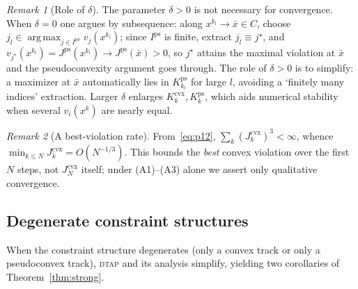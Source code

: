 \documentclass[]{interact}
\theoremstyle{plain}
\theoremstyle{definition}
\theoremstyle{remark}
\newtheorem{remark}{Remark}
\DeclareMathOperator*{\argmax}{arg\,max}
\newcommand{\cvx}{\mathrm{cvx}}
\newcommand{\ps}{\mathrm{ps}}
\newcommand{\dtap}{\textsc{dtap}}
\begin{document}
\begin{remark}[Role of $\delta$]\label{rem:delta-role}
The parameter $\delta>0$ is not necessary for convergence. When $\delta=0$ one argues by
subsequence: along $x^{k_l}\to\bar x\in C$, choose
$j_l\in\argmax_{j\in I^{\ps}}v_j(x^{k_l})$; since $I^{\ps}$ is finite, extract
$j_l\equiv j^\star$, and $v_{j^\star}(x^{k_l})=J^{\ps}(x^{k_l})\to J^{\ps}(\bar x)>0$, so
$j^\star$ attains the maximal violation at $\bar x$ and the pseudoconvexity argument
goes through. The role of $\delta>0$ is to simplify: a maximizer at $\bar x$ automatically
lies in $K^{\ps}_{k_l}$ for large $l$, avoiding a `finitely many indices' extraction.
Larger $\delta$ enlarges $K^{\cvx}_k,K^{\ps}_k$, which aids numerical stability when several
$v_i(x^k)$ are nearly equal.
\end{remark}

\begin{remark}[A best-violation rate]\label{rem:rate}
From~\eqref{eq:p12}, $\sum_k(J^{\cvx}_k)^3<\infty$, whence
$\min_{k\le N}J^{\cvx}_k=O(N^{-1/3})$. This bounds the \emph{best} convex violation over
the first $N$ steps, not $J^{\cvx}_N$ itself; under (A1)--(A3) alone we assert only
qualitative convergence.
\end{remark}

\subsection{Degenerate constraint structures}\label{ssec:degenerate}
When the constraint structure degenerates (only a convex track or only a pseudoconvex
track), \dtap{} and its analysis simplify, yielding two corollaries of
Theorem~\ref{thm:strong}.
\end{document}
